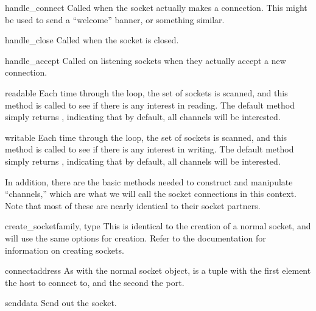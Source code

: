 \begin{methoddesc}{handle_connect}{}
  Called when the socket actually makes a connection.  This 
  might be used to send a ``welcome'' banner, or something 
  similar.
\end{methoddesc}

\begin{methoddesc}{handle_close}{}
  Called when the socket is closed.
\end{methoddesc}

\begin{methoddesc}{handle_accept}{}
  Called on listening sockets when they actually accept a new 
  connection.
\end{methoddesc}

\begin{methoddesc}{readable}{}
  Each time through the  loop, the set of sockets 
  is scanned, and this method is called to see if there is any 
  interest in reading.  The default method simply returns , 
  indicating that by default, all channels will be interested.
\end{methoddesc}

\begin{methoddesc}{writable}{}
  Each time through the  loop, the set of sockets 
  is scanned, and this method is called to see if there is any 
  interest in writing.  The default method simply returns , 
  indicating that by default, all channels will be interested.
\end{methoddesc}

In addition, there are the basic methods needed to construct and
manipulate ``channels,'' which are what we will call the socket
connections in this context. Note that most of these are nearly 
identical to their socket partners.

\begin{methoddesc}{create_socket}{family, type}
  This is identical to the creation of a normal socket, and 
  will use the same options for creation.  Refer to the
   documentation for information on creating
  sockets.
\end{methoddesc}

\begin{methoddesc}{connect}{address}
  As with the normal socket object,  is a 
  tuple with the first element the host to connect to, and the 
  second the port.
\end{methoddesc}

\begin{methoddesc}{send}{data}
  Send  out the socket.
\end{methoddesc}

